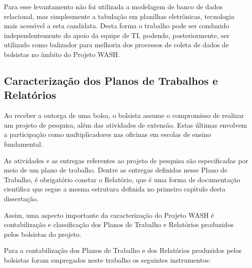 \documentclass[
12pt,		%
openright,	%
twoside,  %
a4paper,			%
chapter=TITLE,		%
english,			%
french,				%
spanish,			%
brazil				%
]{USPSC-classe/USPSC_RedarTex}
\begin{document}
Para esse levantamento n\~ao foi utilizada a modelagem de banco de dados relacional, mas simplesmente a tabula\c{c}\~ao em planilhas eletr\^onicas, tecnologia mais acess\'{\i}vel a esta candidata. Desta forma o trabalho pode ser conduzido independentemente do apoio da equipe de TI, podendo, posteriormente, ser utilizado como balizador para melhoria dos processos de coleta de dados de bolsistas no \^ambito do Projeto WASH.










\subsection[Caracteriza\c{c}\~ao dos Planos de Trabalhos e Relat\'orios]{Caracteriza\c{c}\~ao dos Planos de Trabalhos e Relat\'orios}\label{Caracteriza\c{c}\~ao dos Planos de Trabalhos e Relat\'orios}
Ao receber a outorga de uma bolsa, o bolsista assume o compromisso de realizar um projeto de pesquisa, al\'em das atividades de extens\~ao. Estas \'ultimas envolvem a participa\c{c}\~ao como multiplicadores nas oficinas em escolas de ensino fundamental.










As atividades e as entregas referentes ao projeto de pesquisa s\~ao especificadas por meio de um plano de trabalho. Dentre as entregas definidas nesse Plano de Trabalho, \'e obrigat\'orio constar o Relat\'orio, que \'e uma forma de documenta\c{c}\~ao cient\'{\i}fica que segue a mesma estrutura definida no primeiro cap\'{\i}tulo desta disserta\c{c}\~ao.










Assim, uma aspecto importante da caracteriza\c{c}\~ao do Projeto WASH \'e contabiliza\c{c}\~ao e classifica\c{c}\~ao dos Planos de Trabalho e Relat\'orios produzidos pelos bolsistas do projeto.










Para a contabiliza\c{c}\~ao dos Planos de Trabalho e dos Relat\'orios produzidos pelos bolsistas foram empregados neste trabalho os seguintes instrumentos:
\end{document}
